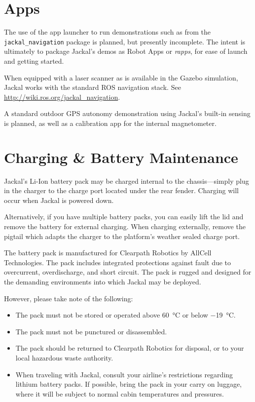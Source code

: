 \documentclass[]{clearpath-latex/clearpath-manual}
\begin{document}

\section{Apps}

\begin{warning}
The use of the app launcher to run demonstrations such as from the \lstinline{jackal_navigation}
package is planned, but presently incomplete. The intent is ultimately to package Jackal's demos as
Robot Apps or \textit{rapps}, for ease of launch and getting started.
\end{warning}

When equipped with a laser scanner as is available in the Gazebo simulation, Jackal works with the
standard ROS navigation stack. See \url{http://wiki.ros.org/jackal_navigation}.

A standard outdoor GPS autonomy demonstration using Jackal's built-in sensing is planned, as well
as a calibration app for the internal magnetometer.


\section{Charging \& Battery Maintenance}

Jackal's Li-Ion battery pack may be charged internal to the chassis---simply plug in
the charger to the charge port located under the rear fender. Charging will occur
when Jackal is powered down.

Alternatively, if you have multiple battery packs, you can easily lift the lid and
remove the battery for external charging. When charging externally, remove the pigtail
which adapts the charger to the platform's weather sealed charge port.

The battery pack is manufactured for Clearpath Robotics by AllCell Technologies. The
pack includes integrated protections against fault due to overcurrent, overdischarge,
and short circuit. The pack is rugged and designed for the demanding environments into
which Jackal may be deployed.

However, please take note of the following:

\begin{itemize}
\item The pack must not be stored or operated above \SI{60}{\celsius} or below \SI{-19}{\celsius}.
\item The pack must not be punctured or disassembled.
\item The pack should be returned to Clearpath Robotics for disposal, or to your
local hazardous waste authority.
\item When traveling with Jackal, consult your airline's restrictions regarding lithium
battery packs. If possible, bring the pack in your carry on luggage, where it will
be subject to normal cabin temperatures and pressures.
\end{itemize}
\end{document}
